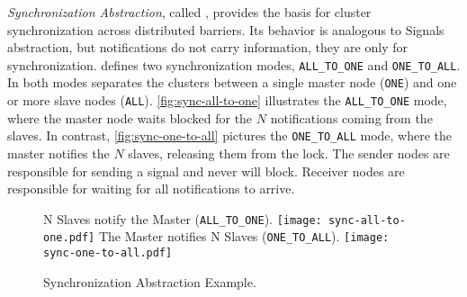 
			\textit{Synchronization Abstraction}, called \sync, provides the basis for cluster synchronization across distributed barriers. Its behavior is analogous to \posix Signals abstraction, but notifications do not carry information, they are only for synchronization.
			\sync defines two synchronization modes, \texttt{ALL\_TO\_ONE} and \texttt{ONE\_TO\_ALL}. In both modes separates the clusters between a single master node (\texttt{ONE}) and one or more slave nodes (\texttt{ALL}). \autoref{fig:sync-all-to-one} illustrates the \texttt{ALL\_TO\_ONE} mode, where the master node waits blocked for the $N$ notifications coming from the slaves. In contrast, \autoref{fig:sync-one-to-all} pictures the \texttt{ONE\_TO\_ALL} mode, where the master notifies the $N$ slaves, releasing them from the lock. The sender nodes are responsible for sending a signal and never will block. Receiver nodes are responsible for waiting for all notifications to arrive.

			\begin{figure}[!tb]
				\centering%
				\caption{Synchronization Abstraction Example.}%
				\label{fig:sync-concepts}%

					{N Slaves notify the Master (\texttt{ALL\_TO\_ONE}).}%
					{\texttt{[image: sync-all-to-one.pdf]}}%
				\hfill
					{The Master notifies N Slaves (\texttt{ONE\_TO\_ALL}).}%
					{\texttt{[image: sync-one-to-all.pdf]}}%

			\end{figure}

